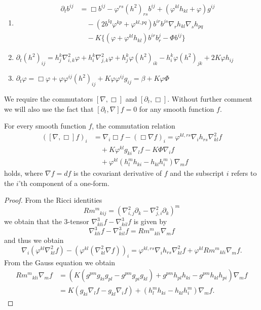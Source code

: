 \documentclass{amsart}
\begin{document}
\begin{lemma}
\begin{enumerate}
\item \label{eq:delt_inversesff} \begin{align*}
\partial_t b^{ij} &= \Box b^{ij} - \varphi^{rs} (h^2)_{rs} b^{ij} + (\varphi^{kl}h_{kl} + \varphi) g^{ij} \\
& \quad - \left(2b^{lq}\varphi^{kp} + \varphi^{kl,pq}\right) b^{ir}b^{js} \nabla_r h_{kl} \nabla_s h_{pq} \\
& \quad - K \{(\varphi + \varphi^{kl}h_{kl}) b^{ir}b^{j}_{r} - \Phi b^{ij}\}
\end{align*}
\item \label{eq:delt_squaredsff} $\partial_t (h^2)_{ij} = h^k_j \nabla^2_{i,k} \varphi + h^k_i \nabla^2_{j,k} \varphi + h^k_j \varphi(h^2)_{ik} - h^k_i \varphi(h^2)_{jk} + 2K\varphi h_{ij}$
\item \label{eq:delt_speed} $\partial_t \varphi = \Box \varphi + \varphi\varphi^{ij}(h^2)_{ij} + K \varphi\varphi^{ij}g_{ij} = \beta + K\varphi\Phi$
\end{enumerate}
\end{lemma}

We require the commutators \([\nabla, \Box]\) and \([\partial_t, \Box]\). Without further comment we will also use the fact that \([\partial_t, \nabla] f = 0\) for any smooth function \(f\).

\begin{lemma}
\label{lem:gradBox}
For every smooth function $f$, the commutation relation
\[
\begin{split}
([\nabla, \Box]f)_i &= \nabla_i \Box f - (\Box \nabla f)_i = \varphi^{kl,rs} \nabla_i h_{rs} \nabla^2_{kl} f \\
&\quad + K \varphi^{kl} g_{ki} \nabla_l f - K \Phi \nabla_i f \\
&\quad + \varphi^{kl}\left(h^{m}_{l}h_{ki} - h_{kl}h^{m}_{i}\right) \nabla_m f
\end{split}
\]
holds, where \(\nabla f = df\) is the covariant derivative of \(f\) and the subscript \(i\) refers to the \(i\)'th component of a one-form.
\end{lemma}

\begin{proof}
From the Ricci identities
\[
{Rm^m}_{kij}  = \left(\nabla^2_{i, j} \partial_k - \nabla^2_{j,i} \partial_k\right)^m
\]
we obtain that the $3$-tensor $\nabla^3_{kli}f-\nabla^3_{kil}f$
is given by
\[
\nabla^3_{kli}f-\nabla^3_{kil}f={Rm^m}_{kli}\nabla_m f
\]
and thus we obtain
\[
\nabla_i (\varphi^{kl} \nabla^2_{kl} f) - (\varphi^{kl}(\nabla^2_{kl} \nabla f))_i = \varphi^{kl,rs} \nabla_i h_{rs} \nabla^2_{kl}f + \varphi^{kl}{Rm^{m}}_{kli} \nabla_m f.
\]
From the Gauss equation we obtain
\[
\begin{split}
{Rm^{m}}_{kli} \nabla_m f &= \left(K\left(g^{pm}g_{ki}g_{pl}  - g^{pm}g_{pi}g_{kl}\right) + g^{pm} h_{pl}h_{ki} - g^{pm}h_{kl}h_{pi}\right) \nabla_m f \\
&= K\left(g_{ki} \nabla_l f - g_{kl} \nabla_i f\right) + \left(h^{m}_{l}h_{ki} - h_{kl}h^{m}_{i}\right) \nabla_m f.
\end{split}
\]
\end{proof}
\end{document}
